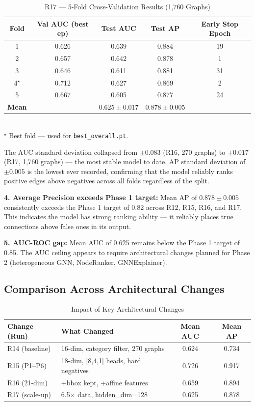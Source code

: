 \documentclass[12pt]{report}
\begin{document}
\begin{table}[H]
\centering
\caption{R17 --- 5-Fold Cross-Validation Results (1,760 Graphs)}
\label{tab:r17_folds}
\begin{tabular}{c c c c c}
\toprule
\textbf{Fold} & \textbf{Val AUC (best ep)} & \textbf{Test AUC} & \textbf{Test AP} & \textbf{Early Stop Epoch} \\
\midrule
1 & 0.626 & 0.639 & 0.884 & 19 \\
2 & 0.657 & 0.642 & 0.878 & 1 \\
3 & 0.646 & 0.611 & 0.881 & 31 \\
4$^\star$ & 0.712 & 0.627 & 0.869 & 2 \\
5 & 0.667 & 0.605 & 0.877 & 24 \\
\midrule
\textbf{Mean} & & $\mathbf{0.625 \pm 0.017}$ & $\mathbf{0.878 \pm 0.005}$ & \\
\bottomrule
\end{tabular}
\\[0.3em]
{\footnotesize $^\star$ Best fold --- used for \texttt{best\_overall.pt}.}
\end{table}

The AUC standard deviation collapsed from $\pm 0.083$ (R16, 270 graphs) to $\pm 0.017$ (R17, 1,760 graphs) --- the most stable model to date. AP standard deviation of $\pm 0.005$ is the lowest ever recorded, confirming that the model reliably ranks positive edges above negatives across all folds regardless of the split.

\textbf{4. Average Precision exceeds Phase 1 target:} Mean AP of $0.878 \pm 0.005$ consistently exceeds the Phase 1 target of 0.82 across R12, R15, R16, and R17. This indicates the model has strong ranking ability --- it reliably places true connections above false ones in its output.

\textbf{5. AUC-ROC gap:} Mean AUC of 0.625 remains below the Phase 1 target of 0.85. The AUC ceiling appears to require architectural changes planned for Phase 2 (heterogeneous GNN, NodeRanker, GNNExplainer).

\subsection{Comparison Across Architectural Changes}

\begin{table}[H]
\centering
\caption{Impact of Key Architectural Changes}
\begin{tabular}{l l c c}
\toprule
\textbf{Change (Run)} & \textbf{What Changed} & \textbf{Mean AUC} & \textbf{Mean AP} \\
\midrule
R14 (baseline) & 16-dim, category filter, 270 graphs & 0.624 & 0.734 \\
R15 (P1--P6) & 18-dim, [8,4,1] heads, hard negatives & 0.726 & 0.917 \\
R16 (21-dim) & +bbox kept, +affine features & 0.659 & 0.894 \\
R17 (scale-up) & 6.5$\times$ data, hidden\_dim=128 & 0.625 & 0.878 \\
\bottomrule
\end{tabular}
\end{table}
\end{document}
